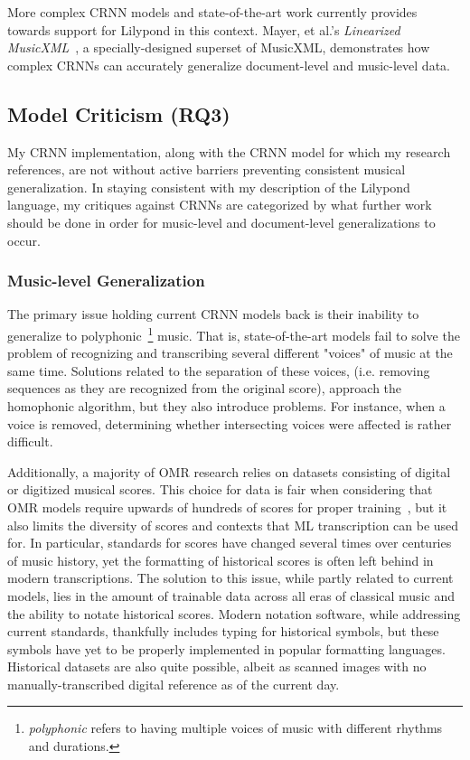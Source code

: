 \documentclass[nonacm, sigconf]{acmart}
\begin{document}
More complex CRNN models and state-of-the-art work currently provides towards support for Lilypond in this context.
Mayer, et al.'s \textit{Linearized MusicXML}~\cite{mayer2024practical}, a specially-designed superset of MusicXML, demonstrates how complex CRNNs can accurately generalize document-level and music-level data.


\subsection{Model Criticism (RQ3)}
My CRNN implementation, along with the CRNN model for which my research references, are not without active barriers preventing consistent musical generalization.
In staying consistent with my description of the Lilypond language, my critiques against CRNNs are categorized by what further work should be done in order for music-level and document-level generalizations to occur.

\subsubsection{Music-level Generalization}
The primary issue holding current CRNN models back is their inability to generalize to polyphonic~\footnote{\textit{polyphonic} refers to having multiple voices of music with different rhythms and durations.} music.
That is, state-of-the-art models fail to solve the problem of recognizing and transcribing several different "voices" of music at the same time.
Solutions related to the separation of these voices, (i.e. removing sequences as they are recognized from the original score), approach the homophonic algorithm, but they also introduce problems.
For instance, when a voice is removed, determining whether intersecting voices were affected is rather difficult.

Additionally, a majority of OMR research relies on datasets consisting of digital or digitized musical scores.
This choice for data is fair when considering that OMR models require upwards of hundreds of scores for proper training~\cite{mayer2024practical}, but it also limits the diversity of scores and contexts that ML transcription can be used for.
In particular, standards for scores have changed several times over centuries of music history, yet the formatting of historical scores is often left behind in modern transcriptions.
The solution to this issue, while partly related to current models, lies in the amount of trainable data across all eras of classical music and the ability to notate historical scores.
Modern notation software, while addressing current standards, thankfully includes typing for historical symbols, but these symbols have yet to be properly implemented in popular formatting languages.
Historical datasets are also quite possible, albeit as scanned images with no manually-transcribed digital reference as of the current day.   
\end{document}
